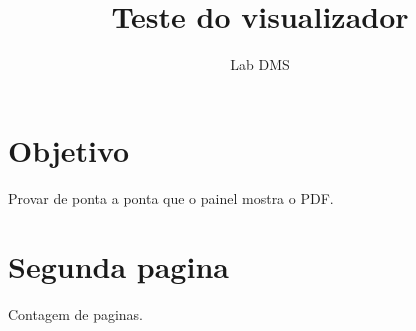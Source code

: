 \documentclass[12pt,a4paper]{article}
\title{Teste do visualizador}
\author{Lab DMS}
\begin{document}
\maketitle
\section{Objetivo}
Provar de ponta a ponta que o painel mostra o PDF.
\newpage
\section{Segunda pagina}
Contagem de paginas.
\end{document}
